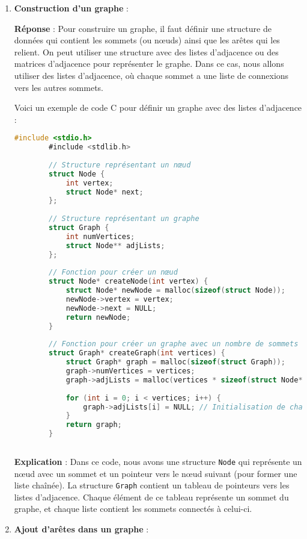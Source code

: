 \begin{enumerate}
	\item \textbf{Construction d'un graphe} :
	
	\textbf{Réponse} :
	Pour construire un graphe, il faut définir une structure de données qui contient les sommets (ou nœuds) ainsi que les arêtes qui les relient. On peut utiliser une structure avec des listes d'adjacence ou des matrices d'adjacence pour représenter le graphe. Dans ce cas, nous allons utiliser des listes d'adjacence, où chaque sommet a une liste de connexions vers les autres sommets.
	
	Voici un exemple de code C pour définir un graphe avec des listes d'adjacence :
	
	\begin{lstlisting}[language=C]
		#include <stdio.h>
		#include <stdlib.h>
		
		// Structure représentant un nœud
		struct Node {
			int vertex;
			struct Node* next;
		};
		
		// Structure représentant un graphe
		struct Graph {
			int numVertices;
			struct Node** adjLists;
		};
		
		// Fonction pour créer un nœud
		struct Node* createNode(int vertex) {
			struct Node* newNode = malloc(sizeof(struct Node));
			newNode->vertex = vertex;
			newNode->next = NULL;
			return newNode;
		}
		
		// Fonction pour créer un graphe avec un nombre de sommets donné
		struct Graph* createGraph(int vertices) {
			struct Graph* graph = malloc(sizeof(struct Graph));
			graph->numVertices = vertices;
			graph->adjLists = malloc(vertices * sizeof(struct Node*));
			
			for (int i = 0; i < vertices; i++) {
				graph->adjLists[i] = NULL; // Initialisation de chaque liste d'adjacence
			}
			return graph;
		}
		
	\end{lstlisting}
	
	\textbf{Explication} :
	Dans ce code, nous avons une structure \texttt{Node} qui représente un nœud avec un sommet et un pointeur vers le nœud suivant (pour former une liste chaînée). La structure \texttt{Graph} contient un tableau de pointeurs vers les listes d'adjacence. Chaque élément de ce tableau représente un sommet du graphe, et chaque liste contient les sommets connectés à celui-ci.
	
	\item \textbf{Ajout d'arêtes dans un graphe} :
	

\end{enumerate}
